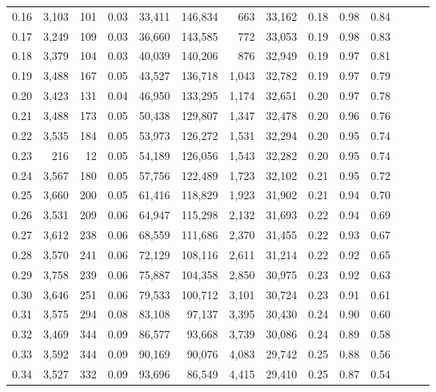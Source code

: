 \begin{tabular}{rrrrrrrrrrrrrr}
0.16 &  3,103 &  101 &  0.03 &   33,411 &  146,834 &     663 &  33,162 &  0.18 &  0.98 &      0.84 \\
0.17 &  3,249 &  109 &  0.03 &   36,660 &  143,585 &     772 &  33,053 &  0.19 &  0.98 &      0.83 \\
0.18 &  3,379 &  104 &  0.03 &   40,039 &  140,206 &     876 &  32,949 &  0.19 &  0.97 &      0.81 \\
0.19 &  3,488 &  167 &  0.05 &   43,527 &  136,718 &   1,043 &  32,782 &  0.19 &  0.97 &      0.79 \\
0.20 &  3,423 &  131 &  0.04 &   46,950 &  133,295 &   1,174 &  32,651 &  0.20 &  0.97 &      0.78 \\
0.21 &  3,488 &  173 &  0.05 &   50,438 &  129,807 &   1,347 &  32,478 &  0.20 &  0.96 &      0.76 \\
0.22 &  3,535 &  184 &  0.05 &   53,973 &  126,272 &   1,531 &  32,294 &  0.20 &  0.95 &      0.74 \\
0.23 &    216 &   12 &  0.05 &   54,189 &  126,056 &   1,543 &  32,282 &  0.20 &  0.95 &      0.74 \\
0.24 &  3,567 &  180 &  0.05 &   57,756 &  122,489 &   1,723 &  32,102 &  0.21 &  0.95 &      0.72 \\
0.25 &  3,660 &  200 &  0.05 &   61,416 &  118,829 &   1,923 &  31,902 &  0.21 &  0.94 &      0.70 \\
0.26 &  3,531 &  209 &  0.06 &   64,947 &  115,298 &   2,132 &  31,693 &  0.22 &  0.94 &      0.69 \\
0.27 &  3,612 &  238 &  0.06 &   68,559 &  111,686 &   2,370 &  31,455 &  0.22 &  0.93 &      0.67 \\
0.28 &  3,570 &  241 &  0.06 &   72,129 &  108,116 &   2,611 &  31,214 &  0.22 &  0.92 &      0.65 \\
0.29 &  3,758 &  239 &  0.06 &   75,887 &  104,358 &   2,850 &  30,975 &  0.23 &  0.92 &      0.63 \\
0.30 &  3,646 &  251 &  0.06 &   79,533 &  100,712 &   3,101 &  30,724 &  0.23 &  0.91 &      0.61 \\
0.31 &  3,575 &  294 &  0.08 &   83,108 &   97,137 &   3,395 &  30,430 &  0.24 &  0.90 &      0.60 \\
0.32 &  3,469 &  344 &  0.09 &   86,577 &   93,668 &   3,739 &  30,086 &  0.24 &  0.89 &      0.58 \\
0.33 &  3,592 &  344 &  0.09 &   90,169 &   90,076 &   4,083 &  29,742 &  0.25 &  0.88 &      0.56 \\
0.34 &  3,527 &  332 &  0.09 &   93,696 &   86,549 &   4,415 &  29,410 &  0.25 &  0.87 &      0.54 \\

\end{tabular}
